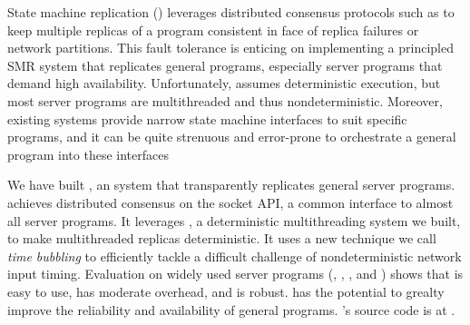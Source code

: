 State machine replication (\smr) leverages distributed consensus protocols
such as \paxos to keep multiple replicas of a program consistent in face
of replica failures or network partitions.  This fault tolerance is
enticing on implementing a principled SMR system that replicates general
programs, especially server programs that demand high
availability. Unfortunately, \smr assumes deterministic execution, but
most server programs are multithreaded and thus nondeterministic.
Moreover, existing \smr systems provide narrow state machine interfaces to
suit specific programs, and it can be quite strenuous and error-prone to
orchestrate a general program into these interfaces

We have built \xxx, an \smr system that transparently replicates
general server programs. \xxx achieves distributed consensus on the socket
API, a common interface to almost all server programs.  It leverages \parrot,
a deterministic multithreading system we built, to make multithreaded replicas 
deterministic. It uses a new technique we call \emph{time bubbling} to 
efficiently tackle a difficult challenge of nondeterministic network input 
timing. Evaluation on \nprog widely used server programs (\eg, \apache, 
\clamav, and \mysql) shows that \xxx is easy to use, has moderate overhead, and 
is robust. \xxx has the potential to grealty improve the reliability and 
availability of general programs. \xxx's source code is at \github.
